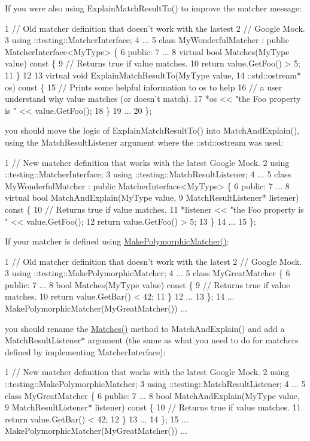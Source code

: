 If you were also using {\ttfamily Explain\+Match\+Result\+To()} to improve the matcher message\+: 
\begin{DoxyCode}
1 // Old matcher definition that doesn't work with the lastest
2 // Google Mock.
3 using ::testing::MatcherInterface;
4 ...
5 class MyWonderfulMatcher : public MatcherInterface<MyType> \{
6  public:
7   ...
8   virtual bool Matches(MyType value) const \{
9     // Returns true if value matches.
10     return value.GetFoo() > 5;
11   \}
12 
13   virtual void ExplainMatchResultTo(MyType value,
14                                     ::std::ostream* os) const \{
15     // Prints some helpful information to os to help
16     // a user understand why value matches (or doesn't match).
17     *os << "the Foo property is " << value.GetFoo();
18   \}
19   ...
20 \};
\end{DoxyCode}


you should move the logic of {\ttfamily Explain\+Match\+Result\+To()} into {\ttfamily Match\+And\+Explain()}, using the {\ttfamily Match\+Result\+Listener} argument where the {\ttfamily \+::std\+::ostream} was used\+: 
\begin{DoxyCode}
1 // New matcher definition that works with the latest Google Mock.
2 using ::testing::MatcherInterface;
3 using ::testing::MatchResultListener;
4 ...
5 class MyWonderfulMatcher : public MatcherInterface<MyType> \{
6  public:
7   ...
8   virtual bool MatchAndExplain(MyType value,
9                                MatchResultListener* listener) const \{
10     // Returns true if value matches.
11     *listener << "the Foo property is " << value.GetFoo();
12     return value.GetFoo() > 5;
13   \}
14   ...
15 \};
\end{DoxyCode}


If your matcher is defined using {\ttfamily \hyperlink{namespacetesting_a667ca94f190ec2e17ee2fbfdb7d3da04}{Make\+Polymorphic\+Matcher()}}\+: 
\begin{DoxyCode}
1 // Old matcher definition that doesn't work with the latest
2 // Google Mock.
3 using ::testing::MakePolymorphicMatcher;
4 ...
5 class MyGreatMatcher \{
6  public:
7   ...
8   bool Matches(MyType value) const \{
9     // Returns true if value matches.
10     return value.GetBar() < 42;
11   \}
12   ...
13 \};
14 ... MakePolymorphicMatcher(MyGreatMatcher()) ...
\end{DoxyCode}


you should rename the {\ttfamily \hyperlink{namespacetesting_ad53b509ae9cd51040d67f668f99702ae}{Matches()}} method to {\ttfamily Match\+And\+Explain()} and add a {\ttfamily Match\+Result\+Listener$\ast$} argument (the same as what you need to do for matchers defined by implementing {\ttfamily Matcher\+Interface})\+: 
\begin{DoxyCode}
1 // New matcher definition that works with the latest Google Mock.
2 using ::testing::MakePolymorphicMatcher;
3 using ::testing::MatchResultListener;
4 ...
5 class MyGreatMatcher \{
6  public:
7   ...
8   bool MatchAndExplain(MyType value,
9                        MatchResultListener* listener) const \{
10     // Returns true if value matches.
11     return value.GetBar() < 42;
12   \}
13   ...
14 \};
15 ... MakePolymorphicMatcher(MyGreatMatcher()) ...
\end{DoxyCode}


